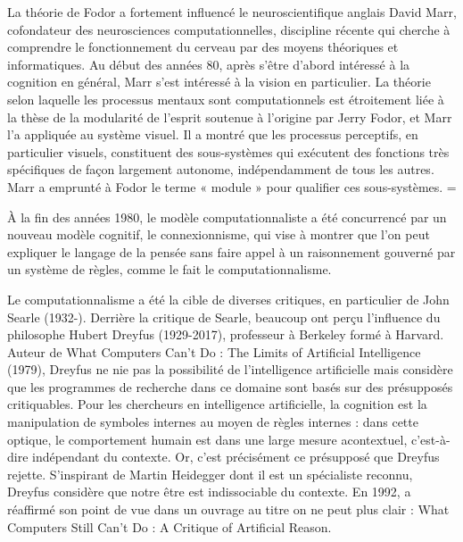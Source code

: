  La théorie de Fodor a fortement influencé le neuroscientifique anglais David Marr, cofondateur des neurosciences computationnelles, discipline récente qui cherche à comprendre le fonctionnement du cerveau par des moyens théoriques et informatiques. Au début des années 80, après s’être d’abord intéressé à la cognition en général, Marr s’est intéressé à la vision en particulier. La théorie selon laquelle les processus mentaux sont computationnels est étroitement liée à la thèse de la modularité de l’esprit soutenue à l’origine par Jerry Fodor, et Marr l’a appliquée au système visuel. Il a montré que les processus perceptifs, en particulier visuels, constituent des sous-systèmes qui exécutent des fonctions très spécifiques de façon largement autonome, indépendamment de tous les autres. Marr a emprunté à Fodor le terme « module » pour qualifier ces sous-systèmes. =\par


À la fin des années 1980, le modèle computationnaliste a été concurrencé par un nouveau modèle cognitif, le connexionnisme, qui vise à montrer que l’on peut expliquer le langage de la pensée sans faire appel à un raisonnement gouverné par un système de règles, comme le fait le computationnalisme.\par

 Le computationnalisme a été la cible de diverses critiques, en particulier de John Searle (1932-). Derrière la critique de Searle, beaucoup ont perçu l'influence du philosophe Hubert Dreyfus (1929-2017), professeur à Berkeley formé à Harvard. Auteur de What Computers Can't Do : The Limits of Artificial Intelligence (1979), Dreyfus ne nie pas la possibilité de l’intelligence artificielle mais considère que les programmes de recherche dans ce domaine sont basés sur des présupposés critiquables. Pour les chercheurs en intelligence artificielle, la cognition est la manipulation de symboles internes au moyen de règles internes : dans cette optique, le comportement humain est dans une large mesure acontextuel, c’est-à-dire indépendant du contexte. Or, c’est précisément ce présupposé que Dreyfus rejette. S’inspirant de Martin Heidegger dont il est un spécialiste reconnu, Dreyfus considère que notre être est indissociable du contexte. En 1992, a réaffirmé son point de vue dans un ouvrage au titre on ne peut plus clair : What Computers Still Can't Do : A Critique of Artificial Reason.\par

